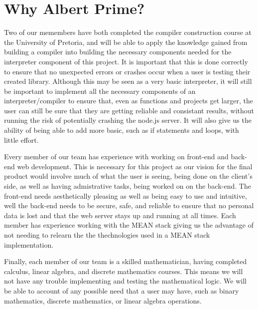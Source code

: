 \documentclass{article}
\begin{document}
	\section{Why Albert Prime?}

    Two of our memembers have both completed the compiler construction course at the University of Pretoria, and will be able to apply 
    the knowledge gained from building a compiler into building the necessary components needed for the interpreter component of this project. 
    It is important that this is done correctly to ensure that no unexpected errors or crashes occur when a user is testing their 
    created library. Although this may be seen as a very basic interpreter, it will still be important to implement all the necessary 
    components of an interpreter/compiler to ensure that, even as functions and projects get larger, the user can still be sure that they are
    getting reliable and consistant results, without running the risk of potentially crashing the node.js server. It will also give us the 
    ability of being able to add more basic, such as if statements and loops, with little effort.\par

    Every member of our team has experience with working on front-end and back-end web development. This is necessary for this project 
    as our vision for the final product would involve much of what the user is seeing, being done on the client's side, as well as having
    admistrative tasks, being worked on on the back-end. The front-end needs aesthetically pleasing as well as being easy to use and intuitive,
    well the back-end needs to be secure, safe, and reliable to ensure that no personal data is lost and that the web server stays up 
    and running at all times. Each member has experience working with the MEAN stack giving us the advantage of not needing to relearn the
    the thechnologies used in a MEAN stack implementation.\par

    Finally, each member of our team is a skilled mathematician, having completed calculus, linear algebra, and discrete mathematics courses.
    This means we will not have any trouble implementing and testing the mathematical logic. We will be able to account of any possible need
    that a user may have, such as binary mathematics, discrete mathematics, or linear algebra operations.
\end{document}
